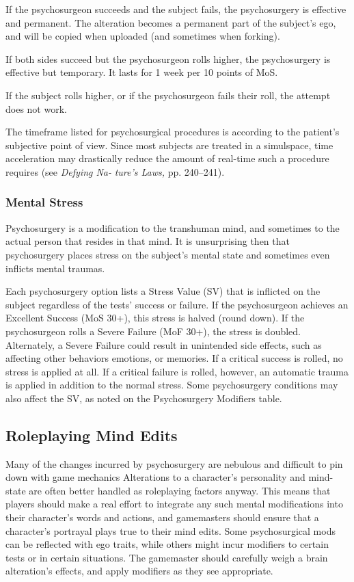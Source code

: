 If the psychosurgeon succeeds and the subject fails, 
the psychosurgery is effective and permanent. The 
alteration becomes a permanent part of the subject's 
ego, and will be copied when uploaded (and sometimes
when forking).

If both sides succeed but the psychosurgeon rolls 
higher, the psychosurgery is effective but temporary. It 
lasts for 1 week per 10 points of MoS.

If the subject rolls higher, or if the psychosurgeon 
fails their roll, the attempt does not work.

The timeframe listed for psychosurgical procedures 
is according to the patient's subjective point of view. 
Since most subjects are treated in a simulspace, time 
acceleration may drastically reduce the amount of 
real-time such a procedure requires (see \textit{Defying Na-}
\textit{ture's Laws,} pp. 240–241).

\subsubsection{Mental Stress}

Psychosurgery is a modification to the transhuman 
mind, and sometimes to the actual person that resides 
in that mind. It is unsurprising then that psychosurgery
places stress on the subject's mental state and
sometimes even inflicts mental traumas.

Each psychosurgery option lists a Stress Value 
(SV) that is inflicted on the subject regardless of 
the tests' success or failure. If the psychosurgeon 
achieves an Excellent Success (MoS 30+), this stress 
is halved (round down). If the psychosurgeon rolls 
a Severe Failure (MoF 30+), the stress is doubled. 
Alternately, a Severe Failure could result in unintended
side effects, such as affecting other behaviors
emotions, or memories.
If a critical success is rolled, no stress is applied at 
all. If a critical failure is rolled, however, an automatic 
trauma is applied in addition to the normal stress.
Some psychosurgery conditions may also affect the 
SV, as noted on the Psychosurgery Modifiers table.

\subsection{Roleplaying Mind Edits}

Many of the changes incurred by psychosurgery are 
nebulous and difficult to pin down with game mechanics
Alterations to a character's personality and
mind-state are often better handled as roleplaying factors
anyway. This means that players should make a
real effort to integrate any such mental modifications 
into their character's words and actions, and gamemasters
should ensure that a character's portrayal
plays true to their mind edits. Some psychosurgical 
mods can be reflected with ego traits, while others 
might incur modifiers to certain tests or in certain 
situations. The gamemaster should carefully weigh a 
brain alteration's effects, and apply modifiers as they 
see appropriate.

